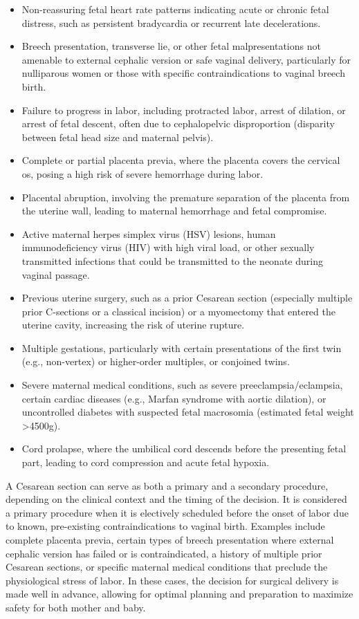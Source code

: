 \begin{itemize}
  \item Non-reassuring fetal heart rate patterns indicating acute or chronic fetal distress, such as persistent bradycardia or recurrent late decelerations.
  \item Breech presentation, transverse lie, or other fetal malpresentations not amenable to external cephalic version or safe vaginal delivery, particularly for nulliparous women or those with specific contraindications to vaginal breech birth.
  \item Failure to progress in labor, including protracted labor, arrest of dilation, or arrest of fetal descent, often due to cephalopelvic disproportion (disparity between fetal head size and maternal pelvis).
  \item Complete or partial placenta previa, where the placenta covers the cervical os, posing a high risk of severe hemorrhage during labor.
  \item Placental abruption, involving the premature separation of the placenta from the uterine wall, leading to maternal hemorrhage and fetal compromise.
  \item Active maternal herpes simplex virus (HSV) lesions, human immunodeficiency virus (HIV) with high viral load, or other sexually transmitted infections that could be transmitted to the neonate during vaginal passage.
  \item Previous uterine surgery, such as a prior Cesarean section (especially multiple prior C-sections or a classical incision) or a myomectomy that entered the uterine cavity, increasing the risk of uterine rupture.
  \item Multiple gestations, particularly with certain presentations of the first twin (e.g., non-vertex) or higher-order multiples, or conjoined twins.
  \item Severe maternal medical conditions, such as severe preeclampsia/eclampsia, certain cardiac diseases (e.g., Marfan syndrome with aortic dilation), or uncontrolled diabetes with suspected fetal macrosomia (estimated fetal weight >4500g).
  \item Cord prolapse, where the umbilical cord descends before the presenting fetal part, leading to cord compression and acute fetal hypoxia.
\end{itemize}

A Cesarean section can serve as both a primary and a secondary procedure, depending on the clinical context and the timing of the decision. It is considered a primary procedure when it is electively scheduled before the onset of labor due to known, pre-existing contraindications to vaginal birth. Examples include complete placenta previa, certain types of breech presentation where external cephalic version has failed or is contraindicated, a history of multiple prior Cesarean sections, or specific maternal medical conditions that preclude the physiological stress of labor. In these cases, the decision for surgical delivery is made well in advance, allowing for optimal planning and preparation to maximize safety for both mother and baby.

